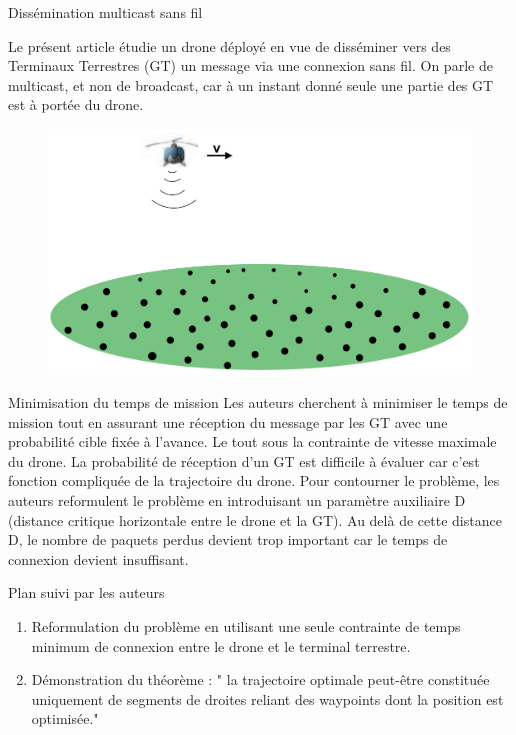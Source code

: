 \begin{frame}{Dissémination multicast sans fil}

Le présent article étudie un drone déployé en vue de disséminer vers des Terminaux Terrestres (GT) un message via une connexion sans fil. On parle de multicast, et non de broadcast, car à un instant donné seule une partie des GT est à portée du drone.

\begin{figure}
	\centering
	\includegraphics[width=0.7\linewidth]{images/multicast}
	\caption{}
	\label{fig:multicast}
\end{figure}

\end{frame}

\begin{frame}{Minimisation du temps de mission}
Les auteurs cherchent à minimiser le temps de mission tout en assurant une réception du message par les GT avec une probabilité cible fixée à l'avance. Le tout sous la contrainte de vitesse maximale du drone. La probabilité de réception d'un GT est difficile à évaluer car c'est fonction compliquée de la trajectoire du drone. Pour contourner le problème, les auteurs reformulent le problème en introduisant un paramètre auxiliaire D (distance critique horizontale entre le drone et la GT). Au delà de cette distance D, le nombre de paquets perdus devient trop important car le temps de connexion devient insuffisant. 


\end{frame}


\newcommand{\asuivre}{\setcounter{sauvegardeenumi}{\theenumi}}
\newcommand{\suite}{\setcounter{enumi}{\thesauvegardeenumi}}

\begin{frame}{Plan suivi par les auteurs}

\begin{enumerate}
	
	\item Reformulation du problème en utilisant une seule contrainte
	de temps minimum de connexion entre le drone et le terminal terrestre.	
	\item Démonstration du théorème : " la trajectoire optimale
	peut-être constituée uniquement de segments de droites reliant des
	waypoints dont la position est optimisée."

	
\end{enumerate}
\asuivre
\end{frame}



